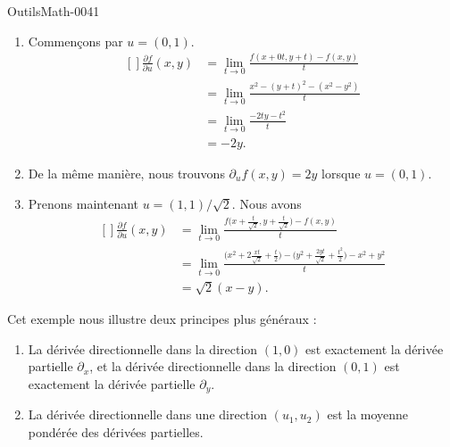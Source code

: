
\begin{corrige}{OutilsMath-0041}

    \begin{enumerate}
        \item
            Commençons par $u=(0,1)$.
            \begin{equation}
                \begin{aligned}[]
                    \frac{ \partial f }{ \partial u }(x,y)&=\lim_{t\to 0} \frac{ f(x+0t,y+t)-f(x,y) }{ t }\\
                    &=\lim_{t\to 0} \frac{ x^2-(y+t)^2-(x^2-y^2) }{ t }\\
                    &=\lim_{t\to 0} \frac{ -2ty-t^2 }{ t }\\
                    &=-2y.
                \end{aligned}
            \end{equation}
        \item
           De la même manière, nous trouvons $\partial_uf(x,y)=2y$ lorsque $u=(0,1)$.
       \item
           Prenons maintenant $u=(1,1)/\sqrt{2}$. Nous avons
           \begin{equation}
               \begin{aligned}[]
                   \frac{ \partial f }{ \partial u }(x,y)&=\lim_{t\to 0} \frac{ f\big( x+\frac{ t }{ \sqrt{2} },y+\frac{ t }{ \sqrt{2} } \big)-f(x,y) }{ t }\\
                   &=\lim_{t\to 0} \frac{ \big( x^2+2\frac{ xt }{ \sqrt{2} }+\frac{ t }{2} \big)-\big( y^2+\frac{ 2yt }{ \sqrt{2} }+\frac{ t^2 }{2} \big) -x^2+y^2 }{ t }\\
                   &=\sqrt{2}(x-y).
               \end{aligned}
           \end{equation}
    \end{enumerate}
    
    \begin{remark}
        Cet exemple nous illustre deux principes plus généraux :
        \begin{enumerate}
            \item
                La dérivée directionnelle dans la direction $(1,0)$ est exactement la dérivée partielle $\partial_x$, et la dérivée directionnelle dans la direction $(0,1)$ est exactement la dérivée partielle $\partial_y$.
            \item
                La dérivée directionnelle dans une direction $(u_1,u_2)$ est la moyenne pondérée des dérivées partielles.
        \end{enumerate}
    \end{remark}

\end{corrige}
